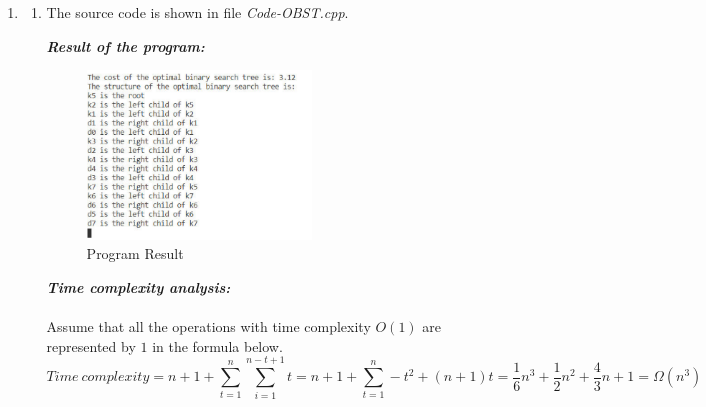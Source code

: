 \documentclass[12pt,a4paper]{article}
\makeatletter
\newtheorem*{solution}{Solution}
\theoremstyle{definition}
\renewenvironment{solution}[1][Solution] {\par\pushQED{\qed}\normalfont\topsep6\p@\@plus6\p@\relax\trivlist\item[\hskip\labelsep\bfseries#1\@addpunct{.}]\ignorespaces}{\popQED\endtrivlist\@endpefalse} \makeatother
\makeatother
\begin{document}
\begin{enumerate}
\begin{solution}
\begin{enumerate}
\begin{algorithm}[H]
                    {
                    }
		            \caption{Pseudocode of optimal binary search  tree}\label{Alg-OBST}
		            
		            \end{algorithm}
		            \item
		            The source code is shown in file \textit{Code-OBST.cpp}.
		            
		            \textbf{\textit{Result of the program:}}
        		    \begin{figure}[htbp]
                        \centering 
                        \includegraphics[width=0.6\textwidth]{Fig-Result1.pdf}
                        \caption{Program Result}\label{Fig-Result1}
                    \end{figure}
                    
		            \textbf{\textit{Time complexity analysis:}}
		            \\
		            \\
		            Assume that all the operations with time complexity $O(1)$ are represented by $1$ in the formula below.
		            $$Time\ complexity=n+1+\sum_{t=1}^n\sum_{i=1}^{n-t+1}t=n+1+\sum_{t=1}^n -t^2+(n+1)t=\frac{1}{6}n^3+\frac{1}{2}n^2+\frac{4}{3}n+1=\Omega(n^3)$$
		            

\end{enumerate}
\end{solution}
\end{enumerate}
\end{document}
